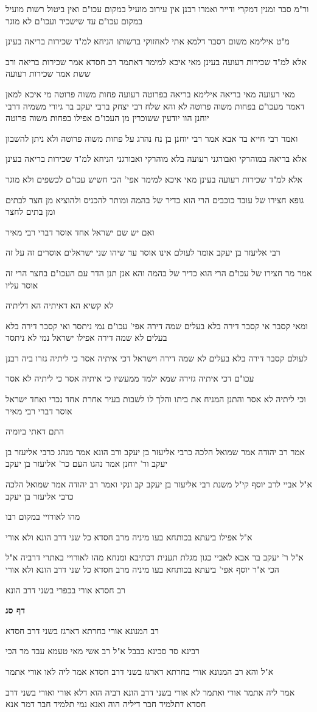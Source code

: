 \documentclass[12pt, openany]{book}
\newcommand{\sethebfont}{
\fontsize{10.5pt}{21.0pt} \selectfont
}
\newcommand{\textblock}[1]{
{\sethebfont #1\\}	
}
\newcommand{\sectname}{}
\newcommand{\newsection}[1]{
	\addcontentsline{toc}{section}{#1}
	\renewcommand{\sectname}{#1}	
	\vspace{-\baselineskip}
	\begin{center}
		\textbf{%
\fontsize{16pt}{16pt}\selectfont
			#1}
	\end{center}
	\vspace{-\baselineskip}
	\nopagebreak
}
\begin{document}
\textblock{ור"מ סבר זמנין דמקרי ודייר ואמרו רבנן אין עירוב מועיל במקום עכו"ם ואין ביטול רשות מועיל במקום עכו"ם עד שישכיר ועכו"ם לא מוגר}
\textblock{מ"ט אילימא משום דסבר דלמא אתי לאחזוקי ברשותו הניחא למ"ד שכירות בריאה בעינן}
\textblock{אלא למ"ד שכירות רעועה בעינן מאי איכא למימר דאתמר רב חסדא אמר שכירות בריאה ורב ששת אמר שכירות רעועה}
\textblock{מאי רעועה מאי בריאה אילימא בריאה בפרוטה רעועה פחות משוה פרוטה מי איכא למאן דאמר מעכו"ם בפחות משוה פרוטה לא והא שלח רבי יצחק ברבי יעקב בר גיורי משמיה דרבי יוחנן הוו יודעין ששוכרין מן העכו"ם אפילו בפחות משוה פרוטה}
\textblock{ואמר רבי חייא בר אבא אמר רבי יוחנן בן נח נהרג על פחות משוה פרוטה ולא ניתן להשבון}
\textblock{אלא בריאה במוהרקי ואבורגני רעועה בלא מוהרקי ואבורגני הניחא למ"ד שכירות בריאה בעינן}
\textblock{אלא למ"ד שכירות רעועה בעינן מאי איכא למימר אפי' הכי חשיש עכו"ם לכשפים ולא מוגר}
\textblock{גופא חצירו של עובד כוכבים הרי הוא כדיר של בהמה ומותר להכניס ולהוציא מן חצר לבתים ומן בתים לחצר}
\textblock{ואם יש שם ישראל אחד אוסר דברי רבי מאיר}
\textblock{רבי אליעזר בן יעקב אומר לעולם אינו אוסר עד שיהו שני ישראלים אוסרים זה על זה}
\textblock{אמר מר חצירו של עכו"ם הרי הוא כדיר של בהמה והא אנן תנן הדר עם העכו"ם בחצר הרי זה אוסר עליו}
\textblock{לא קשיא הא דאיתיה הא דליתיה}
\textblock{ומאי קסבר אי קסבר דירה בלא בעלים שמה דירה אפי' עכו"ם נמי ניתסר ואי קסבר דירה בלא בעלים לא שמה דירה אפילו ישראל נמי לא ניתסר}
\textblock{לעולם קסבר דירה בלא בעלים לא שמה דירה וישראל דכי איתיה אסר כי ליתיה גזרו ביה רבנן}
\textblock{עכו"ם דכי איתיה גזירה שמא ילמד ממעשיו כי איתיה אסר כי ליתיה לא אסר}
\textblock{וכי ליתיה לא אסר והתנן המניח את ביתו והלך לו לשבות בעיר אחרת אחד נכרי ואחד ישראל אוסר דברי רבי מאיר}
\textblock{התם דאתי ביומיה}
\textblock{אמר רב יהודה אמר שמואל הלכה כרבי אליעזר בן יעקב ורב הונא אמר מנהג כרבי אליעזר בן יעקב ור' יוחנן אמר נהגו העם כר' אליעזר בן יעקב}
\textblock{א"ל אביי לרב יוסף קי"ל משנת רבי אליעזר בן יעקב קב ונקי ואמר רב יהודה אמר שמואל הלכה כרבי אליעזר בן יעקב}
\textblock{מהו לאורויי במקום רבו}
\textblock{א"ל אפילו ביעתא בכותחא בעו מיניה מרב חסדא כל שני דרב הונא ולא אורי}
\textblock{א"ל ר' יעקב בר אבא לאביי כגון מגלת תענית דכתיבא ומנחא מהו לאורויי באתרי דרביה א"ל הכי א"ר יוסף אפי' ביעתא בכותחא בעו מיניה מרב חסדא כל שני דרב הונא ולא אורי}
\textblock{רב חסדא אורי בכפרי בשני דרב הונא}
\newsection{דף סג}
\textblock{רב המנונא אורי בחרתא דארגז בשני דרב חסדא}
\textblock{רבינא סר סכינא בבבל א"ל רב אשי מאי טעמא עבד מר הכי}
\textblock{א"ל והא רב המנונא אורי בחרתא דארגז בשני דרב חסדא אמר ליה לאו אורי אתמר}
\textblock{אמר ליה אתמר אורי ואתמר לא אורי בשני דרב הונא רביה הוא דלא אורי ואורי בשני דרב חסדא דתלמיד חבר דיליה הוה ואנא נמי תלמיד חבר דמר אנא}
\end{document}
